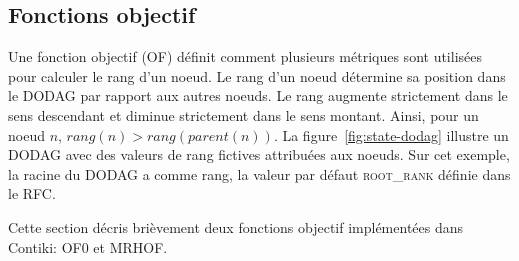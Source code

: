 \subsection*{Fonctions objectif}
Une fonction objectif (OF) définit comment plusieurs métriques sont utilisées pour calculer le rang d'un noeud. Le rang d'un noeud détermine sa position dans le DODAG par rapport aux autres noeuds.
Le rang augmente strictement dans le sens descendant et diminue strictement dans le sens montant. Ainsi, pour un noeud $n$, $rang(n)>rang(parent(n))$. La figure~\ref{fig:state-dodag} illustre un DODAG avec des valeurs de rang fictives attribuées aux noeuds. Sur cet exemple, la racine du DODAG a comme rang, la valeur par défaut \textsc{root\_rank} définie dans le RFC.

Cette section décris brièvement deux fonctions objectif implémentées dans Contiki: OF0 et MRHOF.
